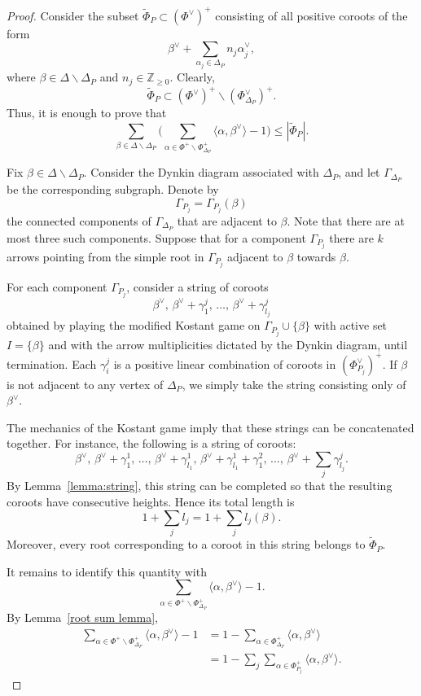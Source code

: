\documentclass[11pt,a4paper]{amsart}
\theoremstyle{plain}
\theoremstyle{definition}
\theoremstyle{remark}
\begin{document}
\begin{proof}
Consider the subset $\tilde{\Phi}_{P}\subset (\Phi^\vee)^+$ consisting of all positive coroots of the form
\[
\beta^\vee+\sum_{\alpha_j\in \Delta_P} n_j\alpha_j^\vee,
\]
where $\beta\in \Delta \smallsetminus \Delta_P$ and $n_j\in\mathbb Z_{\ge 0}$.
Clearly,
\[
\tilde{\Phi}_{P}\subset (\Phi^\vee)^+\smallsetminus (\Phi_{\Delta_P}^\vee)^+.
\]
Thus, it is enough to prove that
\[
\sum_{\beta\in \Delta \smallsetminus \Delta_P}
\Biggl(
\sum_{\alpha\in \Phi^+\smallsetminus \Phi_{\Delta_P}^+}
\langle \alpha,\beta^\vee\rangle-1
\Biggr)
\le |\tilde{\Phi}_{P}|.
\]

Fix $\beta \in \Delta \smallsetminus \Delta_P$. Consider the Dynkin diagram associated with $\Delta_P$, and let $\Gamma_{\Delta_P}$ be the corresponding subgraph. Denote by
\[
\Gamma_{P_j} = \Gamma_{P_j}(\beta)
\]
the connected components of $\Gamma_{\Delta_P}$ that are adjacent to $\beta$. Note that there are at most three such components. Suppose that for a component $\Gamma_{P_j}$ there are $k$ arrows pointing from the simple root in $\Gamma_{P_j}$ adjacent to $\beta$ towards $\beta$.

For each component $\Gamma_{P_j}$, consider a string of coroots
\[
\beta^\vee,\,
\beta^\vee+\gamma_1^j,\,
\ldots,\,
\beta^\vee+\gamma_{l_j}^j
\]
obtained by playing the modified Kostant game on $\Gamma_{P_j}\cup\{\beta\}$ with active set $I=\{\beta\}$ and with the arrow multiplicities dictated by the Dynkin diagram, until termination. Each $\gamma_i^j$ is a positive linear combination of coroots in $(\Phi_{P_j}^\vee)^+$.
If $\beta$ is not adjacent to any vertex of $\Delta_P$, we simply take the string consisting only of $\beta^\vee$.

The mechanics of the Kostant game imply that these strings can be concatenated together. For instance, the following is a string of coroots:
\[
\beta^\vee,\,
\beta^\vee+\gamma_1^1,\,
\ldots,\,
\beta^\vee+\gamma_{l_1}^1,\,
\beta^\vee+\gamma_{l_1}^1+\gamma_1^2,\,
\ldots,\,
\beta^\vee+\sum_j\gamma_{l_j}^j.
\]
By Lemma~\ref{lemma:string}, this string can be completed so that the resulting coroots have consecutive heights. Hence its total length is
\[
1+\sum_j l_j
=1+\sum_j l_j(\beta).
\]
Moreover, every root corresponding to a coroot in this string belongs to $\tilde{\Phi}_{P}$.

It remains to identify this quantity with
\[
\sum_{\alpha\in \Phi^+\smallsetminus \Phi_{\Delta_P}^+}
\langle \alpha,\beta^\vee\rangle-1.
\]
By Lemma~\ref{root sum lemma},
\begin{align*}
\sum_{\alpha\in \Phi^+\smallsetminus \Phi_{\Delta_P}^+}
\langle \alpha,\beta^\vee\rangle-1
&=
1-\sum_{\alpha\in \Phi_{\Delta_P}^+}\langle \alpha,\beta^\vee\rangle \\
&=
1-\sum_j
\sum_{\alpha\in \Phi_{P_j}^+}\langle \alpha,\beta^\vee\rangle.
\end{align*}


\end{proof}
\end{document}
